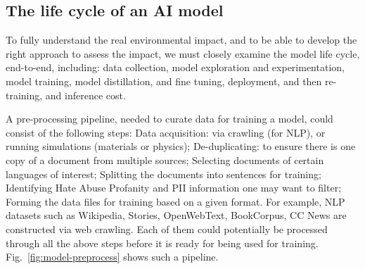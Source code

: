{    %
    
    \subsection{The life cycle of an AI model}
    {
        \label{life-cycle}

        To fully understand the real environmental impact, and to be able to develop the right approach to assess the impact, we must closely examine the model life cycle, end-to-end, including: data collection, model exploration and experimentation, model training, model distillation, and fine tuning, deployment, and then re-training, and inference cost. 

        A pre-processing pipeline, needed to curate data for training a model, could consist of the following steps: Data acquisition: via crawling (for NLP), or running simulations (materials or physics); De-duplicating:  to ensure there is one copy of a document from multiple sources; Selecting documents of certain languages of interest; Splitting the documents into sentences for training; Identifying Hate Abuse Profanity and PII information one may want to filter; Forming the data files for training based on a given format. For example, NLP datasets such as  Wikipedia,  Stories,  OpenWebText, BookCorpus, CC News are constructed via web crawling. Each of them could potentially be processed through all the above steps before it is ready for being used for training. Fig.~\ref{fig:model-preprocess} shows such a pipeline. 

}}
